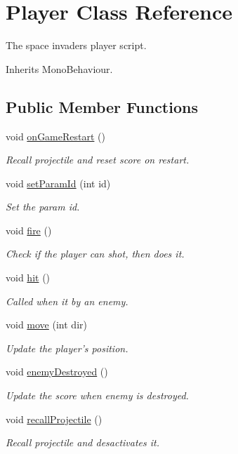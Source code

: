 \hypertarget{class_player}{\section{Player Class Reference}
\label{class_player}
}


The space invaders player script. 




Inherits Mono\-Behaviour.

\subsection*{Public Member Functions}
\begin{DoxyCompactItemize}
\item 
void \hyperlink{class_player_a7d4f926e9f679f2c39fda8be21dfc572}{on\-Game\-Restart} ()
\begin{DoxyCompactList}\small\item\em Recall projectile and reset score on restart.\end{DoxyCompactList}\item 
void \hyperlink{class_player_a83c8c6fd914360886dfdb84daef3ae22}{set\-Param\-Id} (int id)
\begin{DoxyCompactList}\small\item\em Set the param id.\end{DoxyCompactList}\item 
void \hyperlink{class_player_a448dfca18e47394463c535c4df90ec03}{fire} ()
\begin{DoxyCompactList}\small\item\em Check if the player can shot, then does it.\end{DoxyCompactList}\item 
void \hyperlink{class_player_a1b860f38a04870e7ceee55a4e9dd5a84}{hit} ()
\begin{DoxyCompactList}\small\item\em Called when it by an enemy.\end{DoxyCompactList}\item 
void \hyperlink{class_player_aae8376285e8fdad72c273be29b281e99}{move} (int dir)
\begin{DoxyCompactList}\small\item\em Update the player's position.\end{DoxyCompactList}\item 
void \hyperlink{class_player_a43f06d7de41dd66bfd3cd3fda5098433}{enemy\-Destroyed} ()
\begin{DoxyCompactList}\small\item\em Update the score when enemy is destroyed.\end{DoxyCompactList}\item 
void \hyperlink{class_player_ac1aa0f9857ea3ba2f611c314b3fc1f6f}{recall\-Projectile} ()
\begin{DoxyCompactList}\small\item\em Recall projectile and desactivates it.\end{DoxyCompactList}\end{DoxyCompactItemize}
